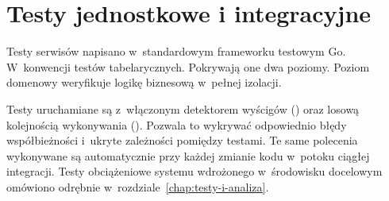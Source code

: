 \section{Testy jednostkowe i integracyjne}
\label{sec:testy-backend}

Testy serwisów napisano w~standardowym frameworku testowym Go. W~konwencji testów tabelarycznych. Pokrywają one
dwa poziomy. Poziom domenowy weryfikuje logikę biznesową w~pełnej izolacji.

Testy uruchamiane są z~włączonym detektorem wyścigów () oraz losową kolejnością wykonywania
(). Pozwala to wykrywać odpowiednio błędy współbieżności i~ukryte zależności pomiędzy testami.
Te same polecenia wykonywane są automatycznie przy każdej zmianie kodu w~potoku ciągłej integracji. 
Testy obciążeniowe systemu wdrożonego w~środowisku docelowym omówiono odrębnie w~rozdziale~\ref{chap:testy-i-analiza}.
